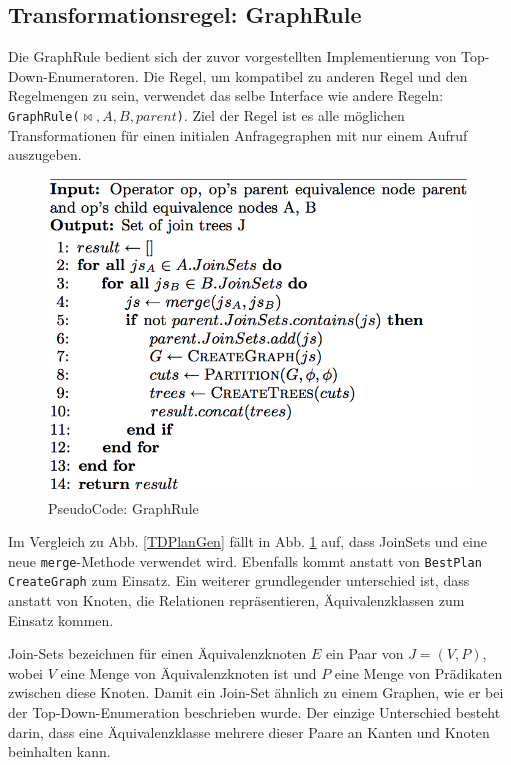 \subsection{Transformationsregel: GraphRule}

Die GraphRule \cite{shanbhag2014optimizing} bedient sich der zuvor vorgestellten Implementierung von Top-Down-Enumeratoren. Die Regel, um kompatibel zu anderen Regel und den Regelmengen zu sein, verwendet das selbe Interface wie andere Regeln: \texttt{GraphRule($\Join, A, B, parent$)}.  Ziel der Regel ist es alle möglichen Transformationen für einen initialen Anfragegraphen mit nur einem Aufruf auszugeben. 

\begin{figure}[ht]
  \centering
  \includegraphics[scale=0.4]{03_Regeln/00_media/GraphRule.png}
  \caption{PseudoCode: GraphRule}
  \label{GraphRule}
\end{figure}

Im Vergleich zu Abb. \ref{TDPlanGen} fällt in Abb. \ref{GraphRule} auf, dass JoinSets und eine neue \texttt{merge}-Methode verwendet wird. Ebenfalls kommt anstatt von \texttt{BestPlan} \texttt{CreateGraph} zum Einsatz. Ein weiterer grundlegender unterschied ist, dass anstatt von Knoten, die Relationen repräsentieren, Äquivalenzklassen zum Einsatz kommen.

Join-Sets bezeichnen für einen Äquivalenzknoten $E$ ein Paar von $J = (V,P)$, wobei $V$ eine Menge von Äquivalenzknoten ist und $P$ eine Menge von Prädikaten zwischen diese Knoten.  Damit ein Join-Set ähnlich zu einem Graphen, wie er bei der Top-Down-Enumeration beschrieben wurde. Der einzige Unterschied besteht darin, dass eine Äquivalenzklasse mehrere dieser Paare an Kanten und Knoten beinhalten kann.

